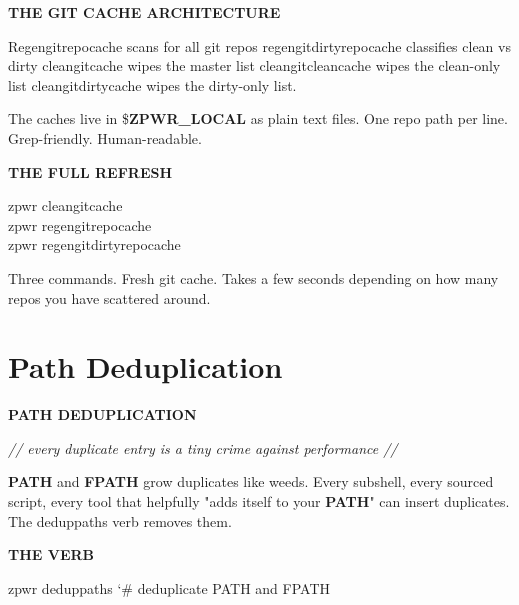 \documentclass[11pt,a4paper,twoside]{book}
\begin{document}
\vspace{12pt}
{\bfseries\color{neonyellow} THE GIT CACHE ARCHITECTURE}\vspace{4pt}

Regengitrepocache        scans for all git repos regengitdirtyrepocache   classifies clean vs dirty cleangitcache            wipes the master list cleangitcleancache       wipes the clean-only list cleangitdirtycache       wipes the dirty-only list.

The caches live in \$\textbf{ZPWR\_LOCAL} as plain text files. One repo path per line. Grep-friendly. Human-readable.


\vspace{12pt}
{\bfseries\color{neonyellow} THE FULL REFRESH}\vspace{4pt}

\begin{codebox}
\color{neongreen}zpwr cleangitcache\\
\color{neongreen}zpwr regengitrepocache\\
\color{neongreen}zpwr regengitdirtyrepocache\\
\end{codebox}

Three commands. Fresh git cache. Takes a few seconds depending on how many repos you have scattered around.


\vspace{16pt}

\section{Path Deduplication}


\vspace{10pt}
{\large\bfseries\color{neoncyan} PATH DEDUPLICATION}\vspace{6pt}

{\small\itshape\color{dimtext} // every duplicate entry is a tiny crime against performance //}

\textbf{PATH} and \textbf{FPATH} grow duplicates like weeds. Every subshell, every sourced script, every tool that helpfully "adds itself to your \textbf{PATH}" can insert duplicates. The deduppaths verb removes them.


\vspace{12pt}
{\bfseries\color{neonyellow} THE VERB}\vspace{4pt}

\begin{codebox}
\color{neongreen}zpwr deduppaths                     {\char`\#} deduplicate PATH and FPATH\\
\end{codebox}
\end{document}
